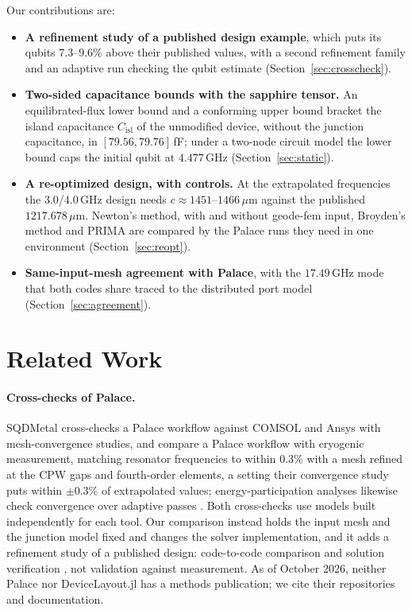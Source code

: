 \documentclass{anvil-paper}
\newcommand{\Cisl}{C_{\mathrm{isl}}}
\begin{document}
Our contributions are:
\begin{itemize}
  \item \textbf{A refinement study of a published design example}, which
    puts its qubits $7.3$--$9.6\%$ above their published values, with a
    second refinement family and an adaptive run checking the qubit
    estimate (Section~\ref{sec:crosscheck}).
  \item \textbf{Two-sided capacitance bounds with the sapphire tensor.}
    An equilibrated-flux lower bound and a conforming upper bound bracket
    the island capacitance $\Cisl$ of the unmodified device, without the
    junction capacitance, in $[79.56, 79.76]$\,fF; under a two-node circuit
    model the lower bound caps the initial qubit at $4.477$\,GHz
    (Section~\ref{sec:static}).
  \item \textbf{A re-optimized design, with controls.} At the extrapolated
    frequencies the $3.0$/$4.0$\,GHz design needs $c \approx
    1451$--$1466\,\mu$m against the published $1217.678\,\mu$m. Newton's
    method, with and without geode-fem input, Broyden's method and PRIMA
    are compared by the Palace runs they need in one environment
    (Section~\ref{sec:reopt}).
  \item \textbf{Same-input-mesh agreement with Palace}, with the
    $17.49$\,GHz mode that both codes share traced to the distributed port
    model (Section~\ref{sec:agreement}).
\end{itemize}

\section{Related Work}
\label{sec:related}

\paragraph{Cross-checks of Palace.}
SQDMetal \citep{sommers2025open} cross-checks a Palace workflow against
COMSOL and Ansys with mesh-convergence studies, and
\citet{ye2025electromagnetic} compare a Palace workflow with cryogenic
measurement, matching resonator frequencies to within $0.3\%$ with a mesh
refined at the CPW gaps and fourth-order elements, a setting their
convergence study puts within $\pm0.3\%$ of extrapolated values;
energy-participation analyses likewise check convergence over adaptive
passes \citep{minev2021energy}. Both cross-checks use models built
independently for each tool. Our comparison instead holds the input mesh
and the junction model fixed and changes the solver implementation, and it
adds a refinement study of a published design: code-to-code comparison and
solution verification \citep{oberkampf2010verification}, not validation
against measurement. As of October 2026, neither Palace nor DeviceLayout.jl has a
methods publication; we cite their repositories and documentation.
\end{document}
